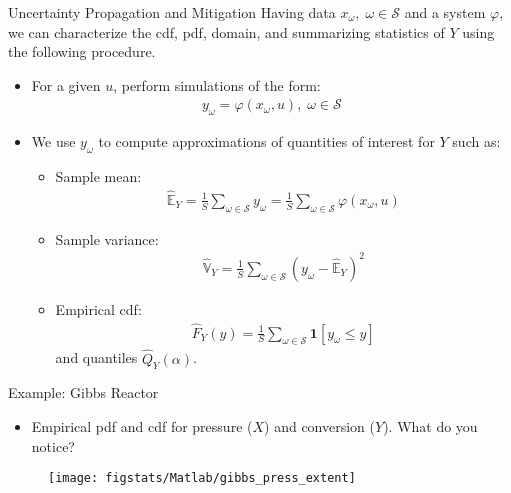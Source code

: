 \documentclass[9pt]{beamer}
\begin{document}
%
\begin{frame}{Uncertainty Propagation and Mitigation}
Having data $x_\omega,\; \omega \in \mathcal{S}$ and a system $\varphi$, we can characterize the cdf, pdf, domain, and summarizing statistics of $Y$ using the following procedure. 
\begin{block}{}
\begin{itemize}
\item For a given $u$, perform simulations of the form:
\begin{align*}
y_\omega=\varphi(x_\omega,u),\; \omega \in \mathcal{S}
\end{align*} 
\item We use $y_\omega$ to compute approximations of quantities of interest for $Y$ such as:
\begin{itemize}
\item Sample mean:
\begin{align*}
 \hat{\mathbb{E}}_Y=\frac{1}{S}\sum_{\omega \in \mathcal{S}}y_\omega=\frac{1}{S}\sum_{\omega \in \mathcal{S}}\varphi(x_\omega,u)
 \end{align*}
\item Sample variance: 
\begin{align*}
\hat{\mathbb{V}}_Y=\frac{1}{S}\sum_{\omega \in \mathcal{S}}(y_\omega-\hat{\mathbb{E}}_Y)^2
\end{align*} 
\item Empirical cdf: 
\begin{align*}
\hat{F}_Y(y)=\frac{1}{S}\sum_{\omega \in \mathcal{S}}\mathbf{1}[y_\omega \leq y] 
\end{align*}
and quantiles $\hat{Q}_Y(\alpha)$.
\end{itemize}
\end{itemize}
\end{block}
\end{frame}

\begin{frame}{Example: Gibbs Reactor}
\begin{itemize}
\item Empirical pdf and cdf for pressure ($X$) and conversion ($Y$). What do you notice?
\end{itemize}
\begin{figure}[!htb]
    \centering
	\texttt{[image: figstats/Matlab/gibbs\_press\_extent]}
\end{figure}

\end{frame}
\end{document}
